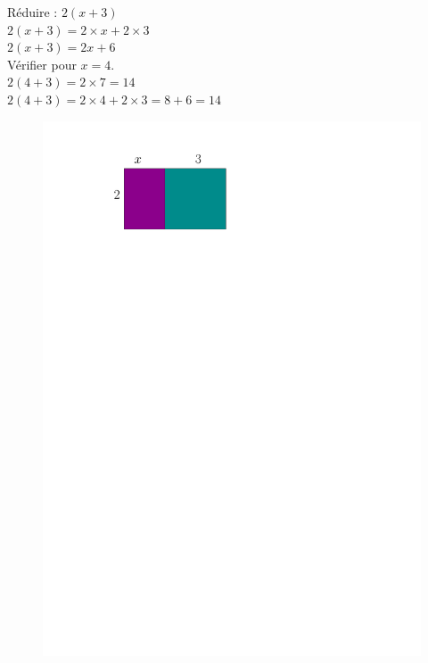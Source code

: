 \documentclass[paper=a4, fontsize=9pt]{scrartcl} %
\begin{document}

\begin{multicols}{2}
Réduire : $2(x + 3)$\\
$ 2(x + 3) = 2 \times x + 2 \times 3$ \\
$ 2(x + 3) = 2x + 6$\\

Vérifier pour $x= 4$.\\
$ 2(4 + 3) = 2 \times 7 = 14$\\
$ 2(4 + 3) = 2 \times 4 + 2 \times 3 = 8 + 6 = 14$\\

\begin{figure}[H]
  \centering
  \includegraphics[width=0.8\linewidth]{sources/1/simple-distri.pdf}
\end{figure}

\end{multicols}
\end{document}

